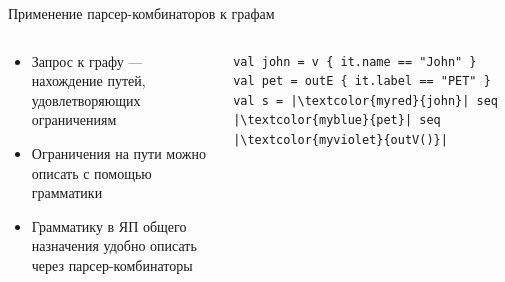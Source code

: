 \documentclass[aspectratio=169]{beamer}
\begin{document}
\begin{frame}[fragile]{Применение парсер-комбинаторов к графам}

  \begin{columns}[c]
    \begin{column}{0.45\textwidth}
      \begin{itemize}
        \item Запрос к графу --- нахождение путей, удовлетворяющих ограничениям
        \item Ограничения на пути можно описать с помощью грамматики
        \item Грамматику в ЯП общего назначения удобно описать через парсер-комбинаторы
      \end{itemize}
    \end{column}
    \begin{column}{0.58\textwidth}
      \begin{verbatim}
val john = v { it.name == "John" }
val pet = outE { it.label == "PET" }
val s = |\textcolor{myred}{john}| seq |\textcolor{myblue}{pet}| seq |\textcolor{myviolet}{outV()}|
\end{verbatim}

    \end{column}
  \end{columns}

\end{frame}
\end{document}
